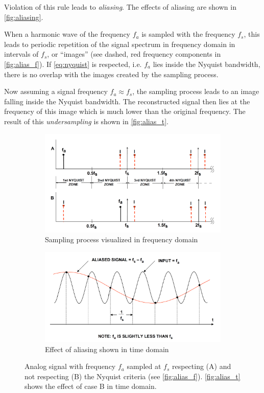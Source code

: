 Violation of this rule leads to \textit{aliasing}.
The effects of aliasing are shown in \autoref{fig:aliasing}.

When a harmonic wave of the frequency $f_a$ is sampled with the frequency $f_s$, this leads to periodic repetition of the signal spectrum in frequency domain in intervals of $f_s$, or ``images'' (see dashed, red frequency components in \autoref{fig:alias_f}). 
If \autoref{eq:nyquist} is respected, i.e. $f_a$ lies inside the Nyquist bandwidth, there is no overlap with the images created by the sampling process.

Now assuming a signal frequency $f_a \approx f_s$, the sampling process leads to an image falling inside the Nyquist bandwidth.
The reconstructed signal then lies at the frequency of this image which is much lower than the original frequency.
The result of this \textit{undersampling} is shown in \autoref{fig:alias_t}. \cite{nyquist, shannon, walt}
\begin{figure}[tb]
	\centering
	\begin{subfigure}{\textwidth}
		\centering
		\includegraphics[width=\linewidth]{chap/02-theory/img/adc/alias_f}  
		\caption{Sampling process visualized in frequency domain}
		\label{fig:alias_f}
	\end{subfigure}
	\begin{subfigure}{\textwidth}
		\centering
		\includegraphics[width=\linewidth]{chap/02-theory/img/adc/alias_t}  
		\caption{Effect of aliasing shown in time domain}
		\label{fig:alias_t}
	\end{subfigure}
	\caption[Aliasing]{Analog signal with frequency $f_a$ sampled at $f_s$ respecting (A) and not respecting (B) the Nyquist criteria (see \autoref{fig:alias_f}). \autoref{fig:alias_t} shows the effect of case B in time domain. \cite{walt}}
	\label{fig:aliasing}
\end{figure}



